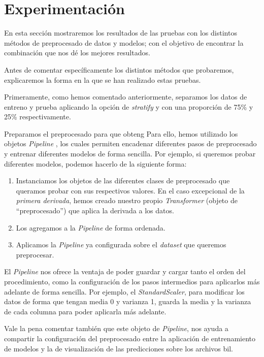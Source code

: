 \section{Experimentación}

En esta sección mostraremos los resultados de las pruebas con los distintos métodos de preprocesado de datos y modelos; con el objetivo de encontrar la combinación que nos dé los mejores resultados.

Antes de comentar específicamente los distintos métodos que probaremos, explicaremos la forma en la que se han realizado estas pruebas.

Primeramente, como hemos comentado anteriormente, separamos los datos de entreno y prueba aplicando la opción de \textit{stratify} y con una proporción de 75\% y 25\% respectivamente.

Preparamos el preprocesado para que obteng
Para ello, hemos utilizado los objetos \textit{Pipeline} \cite{sklearnp32:online}, los cuales permiten encadenar diferentes pasos de preprocesado y entrenar diferentes modelos de forma sencilla. Por ejemplo, si queremos probar diferentes modelos, podemos hacerlo de la siguiente forma: 

\begin{enumerate}
    \item Instanciamos los objetos de las diferentes clases de preprocesado que queramos probar con sus respectivos valores. En el caso excepcional de la \textit{primera derivada}, hemos creado nuestro propio \textit{Transformer} (objeto de ``preprocesado'') que aplica la derivada a los datos.
    \item Los agregamos a la \textit{Pipeline} de forma ordenada.
    \item Aplicamos la \textit{Pipeline} ya configurada sobre el \textit{dataset} que queremos preprocesar.
\end{enumerate}


El \textit{Pipeline} nos ofrece la ventaja de poder guardar y cargar tanto el orden del procedimiento, como la configuración de los pasos intermedios para aplicarlos más adelante de forma sencilla. Por ejemplo, el \textit{StandardScaler}, para modificar los datos de forma que tengan media 0 y varianza 1, guarda la media y la varianza de cada columna para poder aplicarla más adelante.

Vale la pena comentar también que este objeto de \textit{Pipeline}, nos ayuda a compartir la configuración del preprocesado entre la aplicación de entrenamiento de modelos y la de visualización de las predicciones sobre los archivos \gls{bil}.



